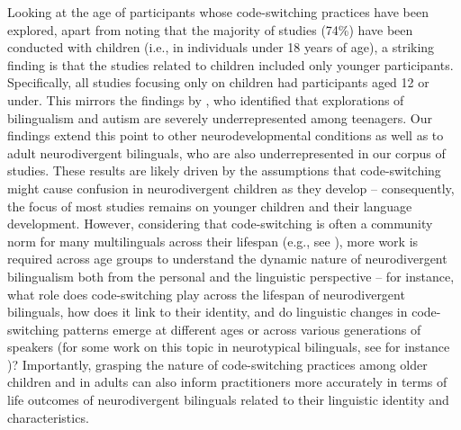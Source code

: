 \documentclass[output=paper]{langscibook}
\begin{document}
Looking at the age of participants whose code-switching practices have been explored, apart from noting that the majority of studies (74\%) have been conducted with children (i.e., in individuals under 18 years of age), a striking finding is that the studies related to children included only younger participants. Specifically, all studies focusing only on children had participants aged 12 or under. This mirrors the findings by \citet{PrévostTuller2021}, who identified that explorations of bilingualism and autism are severely underrepresented among teenagers. Our findings extend this point to other neurodevelopmental conditions as well as to adult neurodivergent bilinguals, who are also underrepresented in our corpus of studies. These results are likely driven by the assumptions that code-switching might cause confusion in neurodivergent children as they develop -- consequently, the focus of most studies remains on younger children and their language development. However, considering that code-switching is often a community norm for many multilinguals across their lifespan (e.g., see \citealt{ParafitaBalamnodate}), more work is required across age groups to understand the dynamic nature of neurodivergent bilingualism both from the personal and the linguistic perspective – for instance, what role does code-switching play across the lifespan of neurodivergent bilinguals, how does it link to their identity, and do linguistic changes in code-switching patterns emerge at different ages or across various generations of speakers (for some work on this topic in neurotypical bilinguals, see for instance  \citealt{GeorgalidouEtAl2010})? Importantly, grasping the nature of code-switching practices among older children and in adults can also inform practitioners more accurately in terms of life outcomes of neurodivergent bilinguals related to their linguistic identity and characteristics.
\end{document}
